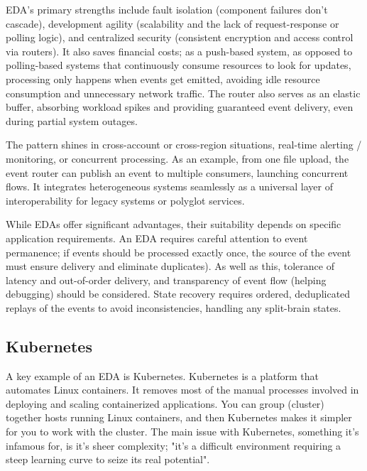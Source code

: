 \documentclass[]{final}
\begin{document}
EDA's primary strengths include fault isolation (component failures don't
cascade), development agility (scalability and the lack of request-response or
polling logic), and centralized security (consistent encryption and access
control via routers). It also saves financial costs; as a push-based system,
as opposed to polling-based systems that continuously consume resources to
look for updates, processing only happens when events get emitted, avoiding
idle resource consumption and unnecessary network traffic. The router also
serves as an elastic buffer, absorbing workload spikes and providing
guaranteed event delivery, even during partial system outages.

\newpage

The pattern shines in cross-account or cross-region situations, real-time
alerting / monitoring, or concurrent processing. As an example, from one file
upload, the event router can publish an event to multiple consumers, launching
concurrent flows. It integrates heterogeneous systems seamlessly as a universal
layer of interoperability for legacy systems or polyglot services.

While EDAs offer significant advantages, their suitability depends on specific
application requirements. An EDA requires careful attention to event
permanence; if events should be processed exactly once, the source of the
event must ensure delivery and eliminate duplicates). As well as this,
tolerance of latency and out-of-order delivery, and transparency of event
flow (helping debugging) should be considered. State recovery requires
ordered, deduplicated replays of the events to avoid inconsistencies,
handling any split-brain states.

\subsection{Kubernetes}

A key example of an EDA is Kubernetes.
Kubernetes is a platform that automates Linux containers. It removes most of
the manual processes involved in deploying and scaling containerized applications.
You can group (cluster) together hosts running Linux containers, and then
Kubernetes makes it simpler for you to work with the cluster. The main issue with
Kubernetes, something it's infamous for, is it's sheer complexity; "it’s a
difficult environment requiring a steep learning curve to seize its
real potential".%
\end{document}
